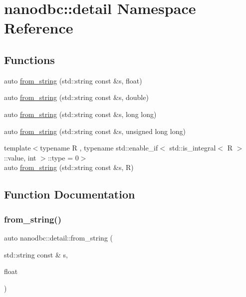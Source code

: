 \hypertarget{namespacenanodbc_1_1detail}{}\section{nanodbc\+::detail Namespace Reference}
\label{namespacenanodbc_1_1detail}
\subsection*{Functions}
\begin{DoxyCompactItemize}
\item 
auto \mbox{\hyperlink{namespacenanodbc_1_1detail_a1b82cd6e39ee7cd939739f4a0550a42c}{from\+\_\+string}} (std\+::string const \&s, float)
\item 
auto \mbox{\hyperlink{namespacenanodbc_1_1detail_ae0551ce1848bfb286f2e452094bcaeb1}{from\+\_\+string}} (std\+::string const \&s, double)
\item 
auto \mbox{\hyperlink{namespacenanodbc_1_1detail_a720867751548d82577c1e401be4df253}{from\+\_\+string}} (std\+::string const \&s, long long)
\item 
auto \mbox{\hyperlink{namespacenanodbc_1_1detail_a7a37700bb1851e4d3bc4a6d852e47e55}{from\+\_\+string}} (std\+::string const \&s, unsigned long long)
\item 
{\footnotesize template$<$typename R , typename std\+::enable\+\_\+if$<$ std\+::is\+\_\+integral$<$ R $>$\+::value, int $>$\+::type  = 0$>$ }\\auto \mbox{\hyperlink{namespacenanodbc_1_1detail_abda6bc1783f2b3d0a6eae7e368bf8b21}{from\+\_\+string}} (std\+::string const \&s, R)
\end{DoxyCompactItemize}


\subsection{Function Documentation}
\mbox{\label{namespacenanodbc_1_1detail_a1b82cd6e39ee7cd939739f4a0550a42c}} 
\subsubsection{\texorpdfstring{from\_string()}{from\_string()}\hspace{0.1cm}{\footnotesize\ttfamily [1/5]}}
{\footnotesize\ttfamily auto nanodbc\+::detail\+::from\+\_\+string (\begin{DoxyParamCaption}\item[{std\+::string const \&}]{s,  }\item[{float}]{ }\end{DoxyParamCaption})}



